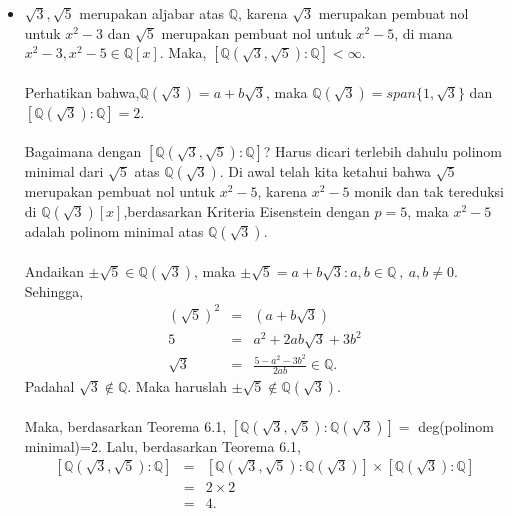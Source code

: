 	\begin{itemize}
	\item $\sqrt{3},\sqrt{5}$ merupakan aljabar atas $\mathbb{Q}$, karena $\sqrt{3}$ merupakan pembuat nol untuk $x^2-3$  dan $\sqrt{5}$ merupakan pembuat nol untuk $x^2-5$, di mana  $x^2-3, x^2-5\in \mathbb{Q}[x]$. Maka, $[\mathbb{Q}(\sqrt{3},\sqrt{5}):			\mathbb{Q}]<\infty$.\\ \\
	Perhatikan bahwa,$\mathbb{Q}(\sqrt{3}) = a+b\sqrt{3}$, maka $\mathbb{Q}(\sqrt{3})=span\{1,\sqrt{3}\}$ dan $[\mathbb{Q}(\sqrt{3}):\mathbb{Q}]=2$. 
	\\ \\
	Bagaimana dengan $[\mathbb{Q}(\sqrt{3},\sqrt{5}):\mathbb{Q}]$? Harus dicari terlebih dahulu polinom minimal dari $\sqrt{5}$ atas $\mathbb{Q}(\sqrt{3})$. Di awal telah kita ketahui bahwa $\sqrt{5}$ merupakan pembuat nol untuk $x^2-5$, karena  $x^2-5$ monik dan tak tereduksi di $\mathbb{Q}(\sqrt{3})[x]$,berdasarkan Kriteria Eisenstein dengan $p=5$, maka $x^2-5$ adalah polinom minimal atas $\mathbb{Q}(\sqrt{3})$.\\ \\
	Andaikan $\pm\sqrt{5} \in \mathbb{Q}(\sqrt{3})$, maka  $\pm\sqrt{5} = a +b\sqrt{3} : a,b\in \mathbb{Q}~,~a,b \ne 0.$ Sehingga,
	$$\begin{array}{rcl}
	(\sqrt{5})^2 &=&  (a +b\sqrt{3})\\
	5&=& a^2+2ab\sqrt{3}+3b^2\\
	\sqrt{3}&=& \frac{5-a^2-3b^2}{2ab} \in\mathbb{Q}.
	\end{array}$$
	Padahal $\sqrt{3} \notin \mathbb{Q}.$ Maka haruslah $\pm\sqrt{5} \notin \mathbb{Q}(\sqrt{3})$.\\ \\
	Maka, berdasarkan Teorema 6.1, $[\mathbb{Q}(\sqrt{3},\sqrt{5}):\mathbb{Q}(\sqrt{3})]=$ deg(polinom minimal)=$2$. Lalu, berdasarkan Teorema 6.1, 
	$$\begin{array}{rcl}
	[\mathbb{Q}(\sqrt{3},\sqrt{5}):\mathbb{Q}] &=& [\mathbb{Q}(\sqrt{3},\sqrt{5}):\mathbb{Q}(\sqrt{3})]\times[\mathbb{Q}(\sqrt{3}):\mathbb{Q}]\\
	&=& 2\times 2\\
	&=& 4.
	\end{array}$$
	\end{itemize}

